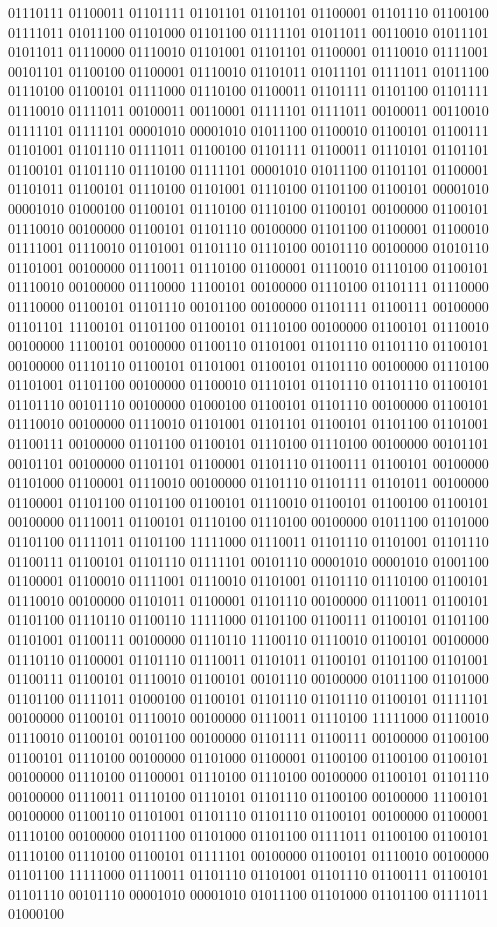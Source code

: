 \documentclass[multi=my]{standalone}
\begin{document}
\begin{slide}
01110111 01100011 01101111 01101101 01101101 01100001 01101110 01100100 01111011 01011100 01101000 01101100 01111101 01011011 00110010 01011101 01011011 01110000 01110010 01101001 01101101 01100001 01110010 01111001 00101101 01100100 01100001 01110010 01101011 01011101 01111011 01011100 01110100 01100101 01111000 01110100 01100011 01101111 01101100 01101111 01110010 01111011 00100011 00110001 01111101 01111011 00100011 00110010 01111101 01111101 00001010 00001010 01011100 01100010 01100101 01100111 01101001 01101110 01111011 01100100 01101111 01100011 01110101 01101101 01100101 01101110 01110100 01111101 00001010 01011100 01101101 01100001 01101011 01100101 01110100 01101001 01110100 01101100 01100101 00001010 00001010 01000100 01100101 01110100 01110100 01100101 00100000 01100101 01110010 00100000 01100101 01101110 00100000 01101100 01100001 01100010 01111001 01110010 01101001 01101110 01110100 00101110 00100000 01010110 01101001 00100000 01110011 01110100 01100001 01110010 01110100 01100101 01110010 00100000 01110000 11100101 00100000 01110100 01101111 01110000 01110000 01100101 01101110 00101100 00100000 01101111 01100111 00100000 01101101 11100101 01101100 01100101 01110100 00100000 01100101 01110010 00100000 11100101 00100000 01100110 01101001 01101110 01101110 01100101 00100000 01110110 01100101 01101001 01100101 01101110 00100000 01110100 01101001 01101100 00100000 01100010 01110101 01101110 01101110 01100101 01101110 00101110 00100000 01000100 01100101 01101110 00100000 01100101 01110010 00100000 01110010 01101001 01101101 01100101 01101100 01101001 01100111 00100000 01101100 01100101 01110100 01110100 00100000 00101101 00101101 00100000 01101101 01100001 01101110 01100111 01100101 00100000 01101000 01100001 01110010 00100000 01101110 01101111 01101011 00100000 01100001 01101100 01101100 01100101 01110010 01100101 01100100 01100101 00100000 01110011 01100101 01110100 01110100 00100000 01011100 01101000 01101100 01111011 01101100 11111000 01110011 01101110 01101001 01101110 01100111 01100101 01101110 01111101 00101110 00001010 00001010 01001100 01100001 01100010 01111001 01110010 01101001 01101110 01110100 01100101 01110010 00100000 01101011 01100001 01101110 00100000 01110011 01100101 01101100 01110110 01100110 11111000 01101100 01100111 01100101 01101100 01101001 01100111 00100000 01110110 11100110 01110010 01100101 00100000 01110110 01100001 01101110 01110011 01101011 01100101 01101100 01101001 01100111 01100101 01110010 01100101 00101110 00100000 01011100 01101000 01101100 01111011 01000100 01100101 01101110 01101110 01100101 01111101 00100000 01100101 01110010 00100000 01110011 01110100 11111000 01110010 01110010 01100101 00101100 00100000 01101111 01100111 00100000 01100100 01100101 01110100 00100000 01101000 01100001 01100100 01100100 01100101 00100000 01110100 01100001 01110100 01110100 00100000 01100101 01101110 00100000 01110011 01110100 01110101 01101110 01100100 00100000 11100101 00100000 01100110 01101001 01101110 01101110 01100101 00100000 01100001 01110100 00100000 01011100 01101000 01101100 01111011 01100100 01100101 01110100 01110100 01100101 01111101 00100000 01100101 01110010 00100000 01101100 11111000 01110011 01101110 01101001 01101110 01100111 01100101 01101110 00101110 00001010 00001010 01011100 01101000 01101100 01111011 01000100 
\end{slide}
\end{document}
